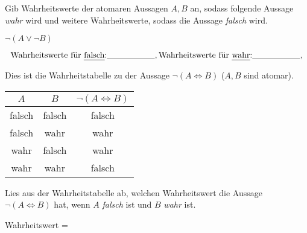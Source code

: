 \documentclass{uebungsblatt}
\begin{document}
\begin{exercise}
    Gib Wahrheitswerte der atomaren Aussagen $A,B$ an, sodass folgende Aussage \emph{wahr} wird
    und weitere Wahrheitswerte, sodass die Aussage \emph{falsch} wird.

    \begin{center}
     $\lnot (A \lor \lnot B)$
    \end{center}
    \[
        \textrm{Wahrheitswerte für \emph{falsch}:}\answerfield{2cm}{9},
        \textrm{Wahrheitswerte für \emph{wahr}:}\answerfield{2cm}{12},
    \]
\end{exercise}


\begin{exercise}

    Dies ist die Wahrheitstabelle zu der Aussage $\lnot (A \iff B)$ ($A,B$ sind atomar).

    \begin{center}
        \begin{tabular}{cc c}\toprule
            $A$ & $B$ & $\lnot (A \iff B)$\\\midrule
            falsch & falsch & falsch\\
            falsch & wahr & wahr \\
            wahr & falsch & wahr\\
            wahr & wahr & falsch \\\bottomrule
        \end{tabular}
    \end{center}

    Lies aus der Wahrheitstabelle ab, welchen Wahrheitswert 
    die Aussage $\lnot (A \iff B)$ hat, wenn $A$ \emph{falsch} ist und $B$ \emph{wahr}
    ist.
    \begin{center}
    Wahrheitswert = 
    \end{center}

\end{exercise}
\end{document}
